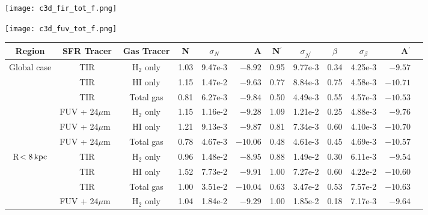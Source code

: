 \documentclass[useAMS,usenatbib]{mn2e}
\newcommand \kpc        {\,{\rm kpc}}
\newcommand \um    {$\mu$m\ }
\newcommand \nprime {N$^\prime$}
\newcommand \eqnprime {N^\prime}
\begin{document}
\begin{figure*}
\centering
\texttt{[image: c3d\_fir\_tot\_f.png]}
\caption{Fitting result from the SFR(TIR) vs total gas.}
\label{fig:es,regs,fir,tot}
\end{figure*}

\begin{figure*}
\centering
\texttt{[image: c3d\_fuv\_tot\_f.png]}
\caption{Fitting result from the SFR(FUV + 24 $\mu$m) vs total gas.}
\label{fig:es,regs,fuv,tot}
\end{figure*}




\begin{table*}
\caption{Fitting parameters of the SF laws from applying the Bayesian.}
\label{table:res}
\begin{tabular}{cccccrccccrr}
\hline\hline
\multicolumn{1}{c}{\multirow{1}{*}{Region}} & SFR Tracer& Gas Tracer & N & $\sigma_N$ & A & \nprime & $\sigma_{\eqnprime}$ & $\beta$ & $\sigma_\beta$ & A$^\prime$& \\
\hline
\multicolumn{1}{c}{\multirow{6}{*}{Global case}} & TIR & H$_2$ only & 1.03 & 9.47e-3  & $-8.92$  & 0.95 & 9.77e-3 & 0.34 & 4.25e-3 & $-9.57$  \\
 & TIR         & HI only    & 1.15 & 1.47e-2 & $-9.63$  & 0.77 & 8.84e-3 & 0.75 & 4.58e-3 & $-10.71$ \\
 & TIR         & Total gas  & 0.81 & 6.27e-3 & $-9.84$  & 0.50 & 4.49e-3 & 0.55 & 4.57e-3 & $-10.53$\\
 & FUV + 24\um & H$_2$ only & 1.15 & 1.16e-2 & $-9.28$  & 1.09 & 1.21e-2 & 0.25 & 4.88e-3 & $-9.76$  \\
 & FUV + 24\um & HI only    & 1.21 & 9.13e-3 & $-9.87$  & 0.81 & 7.34e-3 & 0.60 & 4.10e-3 & $-10.70$ \\
 & FUV + 24\um & Total gas  & 0.78 & 4.67e-3 & $-10.06$ & 0.48 & 4.61e-3 & 0.45 & 4.69e-3 & $-10.57$ \\
\hline
\multicolumn{1}{c}{\multirow{6}{*}{R$< 8\kpc$}}& TIR & H$_2$ only & 0.96 & 1.48e-2 & $-8.95$  & 0.88 & 1.49e-2 & 0.30 & 6.11e-3 & $-9.54$  \\
 & TIR         & HI only    & 1.52 & 7.73e-2  & $-9.91$ & 1.00 & 7.27e-2  & 0.60 & 4.22e-2  & $-10.60$ \\
 & TIR         & Total gas  & 1.00 & 3.51e-2  & $-10.04$ & 0.63 & 3.47e-2  & 0.53 & 7.57e-2  & $-10.63$ \\
 & FUV + 24\um & H$_2$ only & 1.04 & 1.84e-2 & $-9.29$  & 1.00 & 1.85e-2 & 0.18 & 7.17e-3 & $-9.64$  \\

\end{tabular}
\end{table*}
\end{document}
